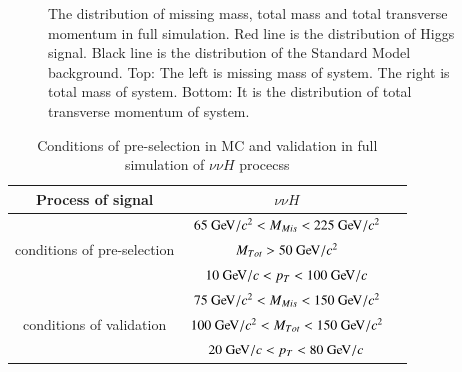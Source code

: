 \documentclass[11pt,a4paper]{cepcnote}
\begin{document}
\begin{figure}[H]
	\centering
	\caption[]{The distribution of missing mass, total mass and total transverse momentum in full simulation. 
	Red line is the distribution of Higgs signal. Black line is the distribution of the Standard Model background.
	Top: The left is missing mass of system. The right is total mass of system.
	Bottom: It is the distribution of total transverse momentum of system.}
	\label{fig:nnHfiltered}
\end{figure}
\begin{table}[H]
  \begin{center}
  \begin{tabular}{|c|c|c|}
  \hline \hline
  Process of signal								&				$\nu\nu H$\\
  \hline
  \multirow{3}{*}{conditions of pre-selection}	&	$65\gev/c^2 < M_{Mis} < 225\gev/c^2$	\\
  												&	$M_{Tot} > 50\gev/c^2$\\
												&	$10\gev/c < p_{T} < 100\gev/c$	\\
  \hline
  \multirow{3}{*}{conditions of validation}		&	$75\gev/c^2 < M_{Mis} < 150\gev/c^2$	\\
  												&	$100\gev/c^2 < M_{Tot} < 150\gev/c^2$	\\
												&	$20\gev/c < p_{T} < 80\gev/c$	\\
  \hline \hline
  \end{tabular}
  \caption[]{Conditions of pre-selection in MC and validation in full simulation of $\nu\nu H$ procecss}
  \label{tab:nnhprecut}
 \end{center}
\end{table}
\end{document}
